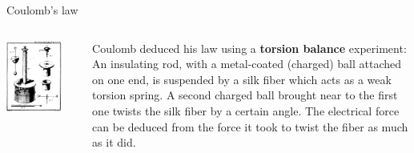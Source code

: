 \begin{frame}{Coulomb's law}
\begin{columns}[t]
\begin{column}{0.55\textwidth}
\begin{center}
      \includegraphics[width=0.80\textwidth]{./images/schematics/coulomb_torsion_balance.png}\\
    \end{center}
  \end{column}
  \begin{column}{0.25\textwidth}
   \begin{center}
    \vspace{0.2cm}
    {\scriptsize
     Coulomb deduced his law using a {\bf torsion balance} experiment:\\
     \vspace{0.2cm}
     An insulating rod, with a metal-coated (charged) ball attached on one end,
     is suspended by a silk fiber which acts as a weak torsion spring.
     A second charged ball brought near to the first one twists the silk fiber by a certain angle.
     The electrical force can be deduced from the force it took to twist the fiber as much as it did.\\
    }
   \end{center}
  \end{column}
\end{columns}

\end{frame}

%
%
%

